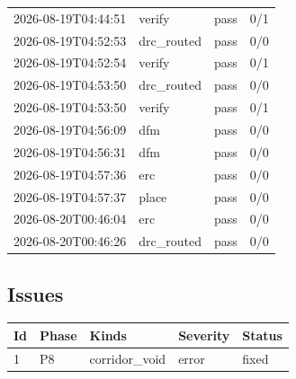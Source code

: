 \documentclass[11pt,a4paper]{article}
\begin{document}
{\begin{longtable}{llll}
2026-08-19T04:44:51 & verify & pass & 0/1 \\
2026-08-19T04:52:53 & drc\_routed & pass & 0/0 \\
2026-08-19T04:52:54 & verify & pass & 0/1 \\
2026-08-19T04:53:50 & drc\_routed & pass & 0/0 \\
2026-08-19T04:53:50 & verify & pass & 0/1 \\
2026-08-19T04:56:09 & dfm & pass & 0/0 \\
2026-08-19T04:56:31 & dfm & pass & 0/0 \\
2026-08-19T04:57:36 & erc & pass & 0/0 \\
2026-08-19T04:57:37 & place & pass & 0/0 \\
2026-08-20T00:46:04 & erc & pass & 0/0 \\
2026-08-20T00:46:26 & drc\_routed & pass & 0/0 \\
\bottomrule
\end{longtable}
}
\subsection*{Issues}
{\small
\begin{longtable}{llp{5cm}ll}
\toprule
\textbf{Id} & \textbf{Phase} & \textbf{Kinds} & \textbf{Severity} & \textbf{Status} \\
\midrule
\endhead
1 & P8 & corridor\_void & error & fixed \\
\bottomrule
\end{longtable}
}
\end{document}
